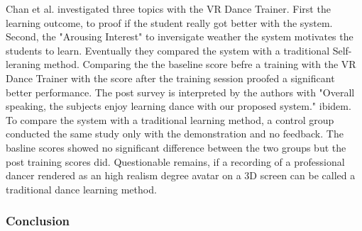 Chan et al. investigated three topics with the VR Dance Trainer. First the learning outcome, to proof if the student really got better with the system. Second, the "Arousing Interest" to inversigate weather the system motivates the students to learn. Eventually they compared the system with a traditional Self-leraning method. Comparing the the baseline score befre a training with the VR Dance Trainer with the score after the training session proofed a significant better performance. The post survey is interpreted by the authors with "Overall speaking, the subjects enjoy learning dance with our proposed system." ibidem. To compare the system with a traditional learning method, a control group conducted the same study only with the demonstration and no feedback. The basline scores showed no significant difference between the two groups but the post training scores did. Questionable remains, if a recording of a professional dancer rendered as an high realism degree avatar on a 3D screen can be called a traditional dance learning method.
\subsubsection{Conclusion}






